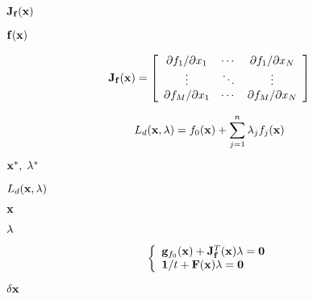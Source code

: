 {\newpage\clearpage
{}%
${\bf J}_{\bf f}({\bf x})$%
\lthtmlinlinemathZ
\lthtmlcheckvsize\clearpage}

{\newpage\clearpage
{}%
${\bf f}({\bf x})$%
\lthtmlinlinemathZ
\lthtmlcheckvsize\clearpage}

{\newpage\clearpage
{}%
\begin{displaymath}
{\bf J}_{\bf f}({\bf x})=  \left[\begin{array}{ccc}
      \partial f_1/\partial x_1&\cdots&\partial f_1/\partial x_N\\
      \vdots & \ddots & \vdots\\
      \partial f_M/\partial x_1&\cdots&\partial f_M/\partial x_N\end{array}\right]
\end{displaymath}%
\lthtmldisplayZ
\lthtmlcheckvsize\clearpage}

{\newpage\clearpage
{}%
\begin{displaymath}
L_d({\bf x},{\bf\lambda})=f_0({\bf x})+\sum_{j=1}^n\lambda_jf_j({\bf x})
\end{displaymath}%
\lthtmldisplayZ
\lthtmlcheckvsize\clearpage}

{\newpage\clearpage
{}%
${\bf x}^*,\;{\bf\lambda}^*$%
\lthtmlinlinemathZ
\lthtmlcheckvsize\clearpage}

{\newpage\clearpage
{}%
$L_d({\bf x},{\bf\lambda})$%
\lthtmlinlinemathZ
\lthtmlcheckvsize\clearpage}

{\newpage\clearpage
{}%
${\bf x}$%
\lthtmlinlinemathZ
\lthtmlcheckvsize\clearpage}

{\newpage\clearpage
{}%
${\bf\lambda}$%
\lthtmlinlinemathZ
\lthtmlcheckvsize\clearpage}

{\newpage\clearpage
{}%
\begin{displaymath}
\left\{\begin{array}{l}
{\bf g}_{f_0}({\bf x})+{\bf J}_{\bf f}^T({\bf x}){\bf\lambda}={\bf0}\\
{\bf 1}/t+{\bf F}({\bf x}){\bf\lambda}={\bf0}\end{array}\right.
\end{displaymath}%
\lthtmldisplayZ
\lthtmlcheckvsize\clearpage}

{\newpage\clearpage
{}%
$\delta{\bf x}$%
\lthtmlinlinemathZ
\lthtmlcheckvsize\clearpage}


